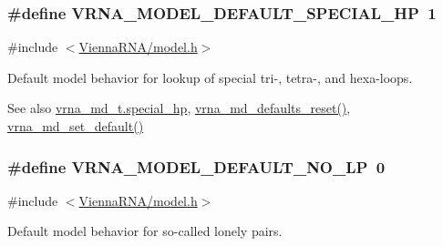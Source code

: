 \subsubsection[{V\+R\+N\+A\+\_\+\+M\+O\+D\+E\+L\+\_\+\+D\+E\+F\+A\+U\+L\+T\+\_\+\+S\+P\+E\+C\+I\+A\+L\+\_\+\+H\+P}]{\setlength{\rightskip}{0pt plus 5cm}\#define V\+R\+N\+A\+\_\+\+M\+O\+D\+E\+L\+\_\+\+D\+E\+F\+A\+U\+L\+T\+\_\+\+S\+P\+E\+C\+I\+A\+L\+\_\+\+H\+P~1}\label{group__model__details_gabd1ab224e1048defd45c165ed7d1c108}


{\ttfamily \#include $<$\hyperlink{model_8h}{Vienna\+R\+N\+A/model.\+h}$>$}



Default model behavior for lookup of special tri-\/, tetra-\/, and hexa-\/loops. 

\begin{DoxySeeAlso}{See also}
\hyperlink{group__model__details_add64a96d23e77ef1d0ddf8dfc5228143}{vrna\+\_\+md\+\_\+t.\+special\+\_\+hp}, \hyperlink{group__model__details_ga70834424cf804d149937de89f80ceb45}{vrna\+\_\+md\+\_\+defaults\+\_\+reset()}, \hyperlink{group__model__details_ga8ac6ff84936282436f822644bf841f66}{vrna\+\_\+md\+\_\+set\+\_\+default()} 
\end{DoxySeeAlso}
\hypertarget{group__model__details_gab72462726dd60ed0d43339bbf7ee08ad}{}
\subsubsection[{V\+R\+N\+A\+\_\+\+M\+O\+D\+E\+L\+\_\+\+D\+E\+F\+A\+U\+L\+T\+\_\+\+N\+O\+\_\+\+L\+P}]{\setlength{\rightskip}{0pt plus 5cm}\#define V\+R\+N\+A\+\_\+\+M\+O\+D\+E\+L\+\_\+\+D\+E\+F\+A\+U\+L\+T\+\_\+\+N\+O\+\_\+\+L\+P~0}\label{group__model__details_gab72462726dd60ed0d43339bbf7ee08ad}


{\ttfamily \#include $<$\hyperlink{model_8h}{Vienna\+R\+N\+A/model.\+h}$>$}



Default model behavior for so-\/called \textquotesingle{}lonely pairs\textquotesingle{}. 


